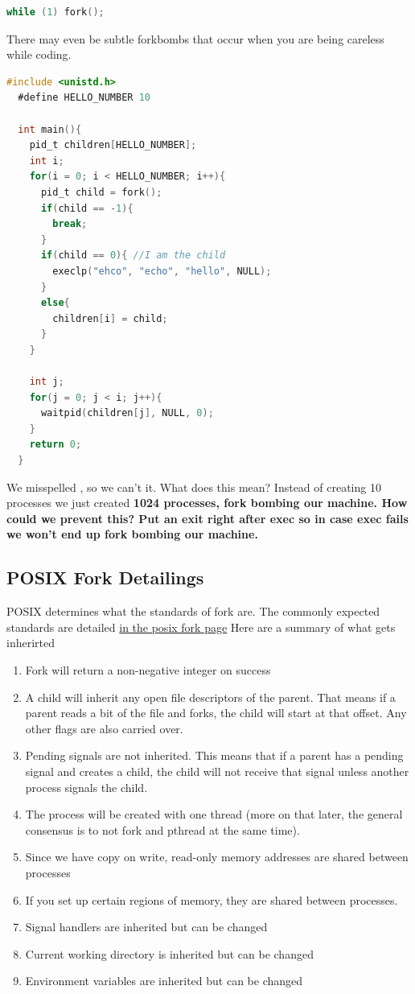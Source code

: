 \begin{lstlisting}[language=C]
  while (1) fork();
\end{lstlisting}

There may even be subtle forkbombs that occur when you are being careless while coding.

\begin{lstlisting}[language=C]
  #include <unistd.h>
  #define HELLO_NUMBER 10

  int main(){
    pid_t children[HELLO_NUMBER];
    int i;
    for(i = 0; i < HELLO_NUMBER; i++){
      pid_t child = fork();
      if(child == -1){
        break;
      }
      if(child == 0){ //I am the child
        execlp("ehco", "echo", "hello", NULL);
      }
      else{
        children[i] = child;
      }
    }

    int j;
    for(j = 0; j < i; j++){
      waitpid(children[j], NULL, 0);
    }
    return 0;
  }
\end{lstlisting}

We misspelled , so we can't  it. What does this mean? Instead of creating 10 processes we just created \textbf{1024 processes, fork bombing our machine. How could we prevent this? Put an exit right after exec so in case exec fails we won't end up fork bombing our machine.}

\subsection{POSIX Fork Detailings}

POSIX determines what the standards of fork are. The commonly expected standards are detailed \href{https://pubs.opengroup.org/onlinepubs/009695399/functions/fork.html}{in the posix fork page} Here are a summary of what gets inherirted

\begin{enumerate}
\item Fork will return a non-negative integer on success
\item A child will inherit any open file descriptors of the parent. That means if a parent reads a bit of the file and forks, the child will start at that offset. Any other flags are also carried over.
\item Pending signals are not inherited. This means that if a parent has a pending signal and creates a child, the child will not receive that signal unless another process signals the child.
\item The process will be created with one thread (more on that later, the general consensus is to not fork and pthread at the same time).
\item Since we have copy on write, read-only memory addresses are shared between processes
\item If you set up certain regions of memory, they are shared between processes.
\item Signal handlers are inherited but can be changed
\item Current working directory is inherited but can be changed
\item Environment variables are inherited but can be changed
\end{enumerate}

